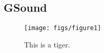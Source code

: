 
\subsection{GSound}



\begin{figure*}
  \texttt{[image: figs/figure1]}
  \caption{This is a tiger.}
\end{figure*}

